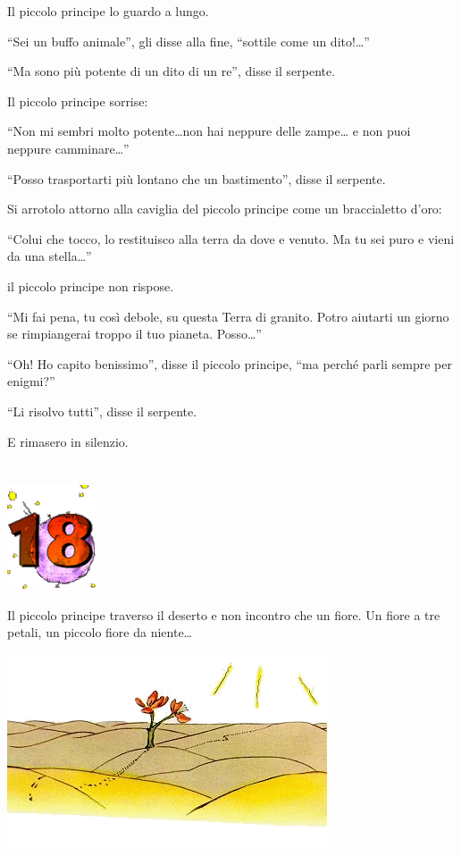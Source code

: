 \documentclass[11pt]{scrbook}
\begin{document}
Il piccolo principe lo guardo a lungo.

``Sei un buffo animale'', gli disse alla fine, ``sottile come un
dito!\ldots{}''

``Ma sono più potente di un dito di un re'', disse il serpente.

Il piccolo principe sorrise:

``Non mi sembri molto potente\ldots{}non hai neppure delle zampe\ldots{}
e non puoi neppure camminare\ldots{}''

``Posso trasportarti più lontano che un bastimento'', disse il serpente.

Si arrotolo attorno alla caviglia del piccolo principe come un
braccialetto d'oro:

``Colui che tocco, lo restituisco alla terra da dove e venuto. Ma tu sei
puro e vieni da una stella\ldots{}''

il piccolo principe non rispose.

``Mi fai pena, tu così debole, su questa Terra di granito. Potro
aiutarti un giorno se rimpiangerai troppo il tuo pianeta.
Posso\ldots{}''

``Oh! Ho capito benissimo'', disse il piccolo principe, ``ma perché
parli sempre per enigmi?''

``Li risolvo tutti'', disse il serpente.

E rimasero in silenzio.

\chapter{}
\begin{center}
\includegraphics{img/chapter18}
\end{center}

Il piccolo principe traverso il deserto e non incontro che un fiore. Un
fiore a tre petali, un piccolo fiore da niente\ldots{}

\begin{center}
\includegraphics{img/18a}
\end{center}
\end{document}
